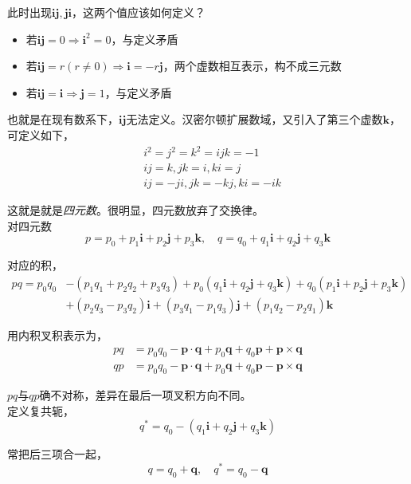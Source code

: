 \documentclass[hpyerref,UTF8,a4paper,titlepage,12pt,oneside]{ctexbook}
\theoremstyle{definition}
\begin{document}
此时出现$\mathbf{i}\mathbf{j},\mathbf{j}\mathbf{i}$，这两个值应该如何定义？

\begin{itemize}
	\item 若$\mathbf{i}\mathbf{j}=0 \Rightarrow \mathbf{i}^2 = 0$，与定义矛盾
	\item 若$\mathbf{i}\mathbf{j}=r(r\ne 0)\Rightarrow \mathbf{i}=-r\mathbf{j}$，两个虚数相互表示，构不成三元数
	\item 若$\mathbf{i}\mathbf{j}=\mathbf{i}\Rightarrow \mathbf{j} = 1$，与定义矛盾
\end{itemize}

也就是在现有数系下，$\mathbf{i}\mathbf{j}$无法定义。汉密尔顿扩展数域，又引入了第三个虚数$\mathbf{k}$，可定义如下，
\begin{align*}
	&i^2 = j^2 = k^2 = ijk= -1\\
	&ij=k,jk=i,ki =j\\
	&ij=-ji,jk=-kj,ki=-ik
\end{align*}

这就是就是\textit{四元数}。很明显，四元数放弃了交换律。\\

对四元数
$$
	p = p_0 +p_1 \mathbf{i} +p_2 \mathbf{j} +p_3 \mathbf{k}, \quad q = q_0 +q_1 \mathbf{i} +q_2 \mathbf{j} +q_3 \mathbf{k}
$$

对应的积，
\begin{align*}
	pq = p_0q_0 &- (p_1q_1 + p_2q_2 +p_3q_3) +p_0(q_1\mathbf{i} +q_2\mathbf{j} + q_3 \mathbf{k}) +q_0(p_1 \mathbf{i} + p_2 \mathbf{j} + p_3 \mathbf{k})\\
		& +(p_2q_3 -p_3q_2)\mathbf{i} +(p_3q_1 -p_1q_3)\mathbf{j} + (p_1q_2 - p_2q_1)\mathbf{k}
\end{align*}

用内积叉积表示为，
\begin{align}\label{quatern_multiple}
	pq &= p_0q_0 - \mathbf{p}\cdot \mathbf{q} +p_0 \mathbf{q} +q_0 \mathbf{p} + \mathbf{p} \times \mathbf{q}\\
	qp &= p_0q_0 - \mathbf{p}\cdot \mathbf{q} +p_0 \mathbf{q} +q_0 \mathbf{p}  - \mathbf{p} \times \mathbf{q}
\end{align}

$pq$与$qp$确不对称，差异在最后一项叉积方向不同。\\

定义复共轭，
$$
	q^* = q_0 -( q_1 \mathbf{i} +q_2 \mathbf{j} +q_3 \mathbf{k})
$$

常把后三项合一起，
$$
	q = q_0 + \mathbf{q}, \quad q^* = q_0 - \mathbf{q}
$$
\end{document}
